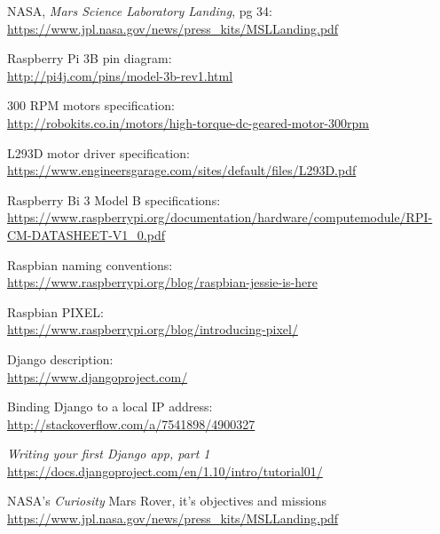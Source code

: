 \documentclass[a4paper, 12pt, onecolumn]{article}
\begin{document}
\begin{thebibliography}{10}	%
	
	 NASA, \textit{Mars Science Laboratory Landing}, pg 34: \\
	\url{https://www.jpl.nasa.gov/news/press_kits/MSLLanding.pdf}
	
	
	 Raspberry Pi 3B pin diagram: \\
	\url{http://pi4j.com/pins/model-3b-rev1.html}

	
	 300 RPM motors specification: \\
	\url{http://robokits.co.in/motors/high-torque-dc-geared-motor-300rpm}
	
	 L293D motor driver specification: \\
	\url{https://www.engineersgarage.com/sites/default/files/L293D.pdf}
	

	 Raspberry Bi 3 Model B specifications: \\
	\url{https://www.raspberrypi.org/documentation/hardware/computemodule/RPI-CM-DATASHEET-V1_0.pdf}
		
	
	 Raspbian naming conventions: \\
	\url{https://www.raspberrypi.org/blog/raspbian-jessie-is-here}
	
	 Raspbian PIXEL: \\
	\url{https://www.raspberrypi.org/blog/introducing-pixel/}
	
	 Django description: \\
	\url{https://www.djangoproject.com/}
	
	 Binding Django to a local IP address: \\
	\url{http://stackoverflow.com/a/7541898/4900327}
	
	 \textit{Writing your first Django app, part 1} \\
	\url{https://docs.djangoproject.com/en/1.10/intro/tutorial01/}
	
	 NASA's \textit{Curiosity} Mars Rover, it's objectives and missions \\
	\url{https://www.jpl.nasa.gov/news/press_kits/MSLLanding.pdf}
	
	
\end{thebibliography}
\end{document}
